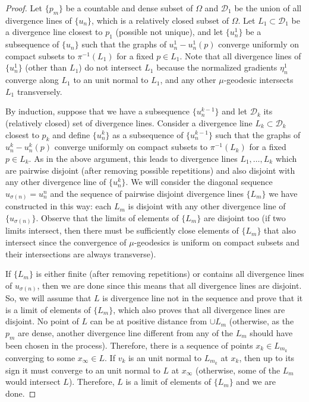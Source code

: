 \documentclass[a4paper,10pt,reqno]{amsart}
\theoremstyle{definition}
\theoremstyle{remark}
\numberwithin{equation}{section}
\begin{document}
\begin{proof}
Let $\{p_m\}$ be a countable and dense subset of $\Omega$ and $\mathcal D_1$ be the union of all divergence lines of $\{u_n\}$, which is a relatively closed subset of $\Omega$. Let $L_1\subset\mathcal D_1$ be a divergence line closest to $p_1$ (possible not unique), and let $\{u_n^1\}$ be a subsequence of $\{u_n\}$ such that the graphs of $u_n^1-u_n^1(p)$ converge uniformly on compact subsets to $\pi^{-1}(L_1)$ for a fixed $p\in L_1$. Note that all divergence lines of $\{u_n^1\}$ (other than $L_1$) do not intersect $L_1$ because the normalized gradients $\eta_n^1$ converge along $L_1$ to an unit normal to $L_1$, and any other $\mu$-geodesic intersects $L_1$ transversely.

By induction, suppose that we have a subsequence $\{u_n^{k-1}\}$ and let $\mathcal D_k$ its (relatively closed) set of divergence lines. Consider a divergence line $L_k\subset\mathcal D_k$ closest to $p_k$ and define $\{u_n^k\}$ as a subsequence of $\{u_n^{k-1}\}$ such that the graphs of $u_n^k-u_n^k(p)$ converge uniformly on compact subsets to $\pi^{-1}(L_k)$ for a fixed $p\in L_k$. As in the above argument, this leads to divergence lines $L_1,\ldots,L_k$ which are pairwise disjoint (after removing possible repetitions) and also disjoint with any other divergence line of $\{u_n^k\}$. We will consider the diagonal sequence $u_{\sigma(n)}=u_n^n$ and the sequence of pairwise disjoint divergence lines $\{L_m\}$ we have constructed in this way: each $L_m$ is disjoint with any other divergence line of $\{u_{\sigma(n)}\}$. Observe that the limits of elements of $\{L_m\}$ are disjoint too (if two limits intersect, then there must be sufficiently close elements of $\{L_m\}$ that also intersect since the convergence of $\mu$-geodesics is uniform on compact subsets and their intersections are always transverse). 

If $\{L_m\}$ is either finite (after removing repetitions) or contains all divergence lines of $u_{\sigma(n)}$, then we are done since this means that all divergence lines are disjoint. So, we will assume that $L$ is divergence line not in the sequence and prove that it is a limit of elements of $\{L_m\}$, which also proves that all divergence lines are disjoint. No point of $L$ can be at positive distance from $\cup L_m$ (otherwise, as the $p_m$ are dense, another divergence line different from any of the $L_m$ should have been chosen in the process). Therefore, there is a sequence of points $x_k\in L_{m_k}$ converging to some $x_\infty\in L$. If $v_k$ is an unit normal to $L_{m_k}$ at $x_k$, then up to its sign it must converge to an unit normal to $L$ at $x_{\infty}$ (otherwise, some of the $L_{m}$ would intersect $L$). Therefore, $L$ is a limit of elements of $\{L_m\}$ and we are done.


\end{proof}
\end{document}
